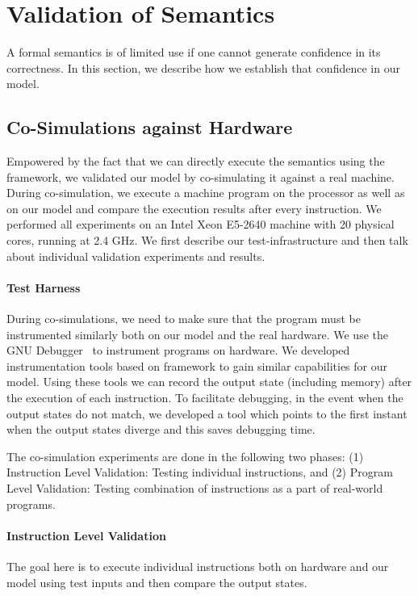 \section{Validation of Semantics} \label{sec:Eval}

A formal semantics is of limited use if one cannot generate confidence in its correctness. In this section, we describe how we establish that confidence in our model. 




\subsection{Co-Simulations against Hardware}
Empowered by the fact that we can directly execute the semantics using the \K framework,  we validated our model by  co-simulating  it against a real machine. During co-simulation, we execute a machine program on the processor as well as on our \K model and compare the execution results after every instruction. We performed all experiments on an Intel Xeon E5-2640 machine with 20 physical cores, running at 2.4 GHz. We first describe our test-infrastructure and then talk about individual validation experiments and results.

\paragraph{Test Harness}

During co-simulations, we need to make sure that the program must be instrumented similarly both on our model and the real hardware. We use the GNU Debugger~\cite{GDB} to instrument programs on hardware. We developed instrumentation tools based on \K framework to gain similar capabilities for our model. Using these tools we can record the output state (including memory) after the execution of each instruction. 
To facilitate debugging, in the event when the output states do not match, we developed a tool which points to the first instant when the output states diverge and this saves debugging time. 

The co-simulation experiments are done in the following two phases: (1) Instruction Level Validation: Testing individual instructions, and (2) Program Level Validation: Testing combination of instructions  as a part of real-world programs. 

\paragraph{Instruction Level Validation}
The goal here is to execute individual instructions both on hardware and our model using test inputs and then compare the output states. 

